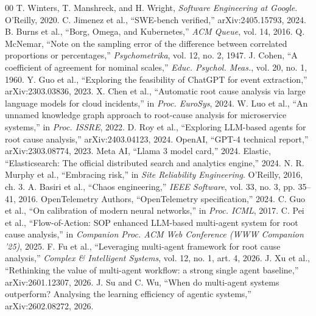 \documentclass[10pt,conference]{IEEEtran}
\begin{document}
\begin{thebibliography}{00}
 T. Winters, T. Manshreck, and H. Wright, \emph{Software Engineering at Google}. O'Reilly, 2020.
 C. Jimenez et al., ``SWE-bench verified,'' arXiv:2405.15793, 2024.
 B. Burns et al., ``Borg, Omega, and Kubernetes,'' \emph{ACM Queue}, vol. 14, 2016.
 Q. McNemar, ``Note on the sampling error of the difference between correlated proportions or percentages,'' \emph{Psychometrika}, vol. 12, no. 2, 1947.
 J. Cohen, ``A coefficient of agreement for nominal scales,'' \emph{Educ. Psychol. Meas.}, vol. 20, no. 1, 1960.
 Y. Guo et al., ``Exploring the feasibility of ChatGPT for event extraction,'' arXiv:2303.03836, 2023.
 X. Chen et al., ``Automatic root cause analysis via large language models for cloud incidents,'' in \emph{Proc. EuroSys}, 2024.
 W. Luo et al., ``An unnamed knowledge graph approach to root-cause analysis for microservice systems,'' in \emph{Proc. ISSRE}, 2022.
 D. Roy et al., ``Exploring LLM-based agents for root cause analysis,'' arXiv:2403.04123, 2024.
 OpenAI, ``GPT-4 technical report,'' arXiv:2303.08774, 2023.
 Meta AI, ``Llama 3 model card,'' 2024.
 Elastic, ``Elasticsearch: The official distributed search and analytics engine,'' 2024.
 N. R. Murphy et al., ``Embracing risk,'' in \emph{Site Reliability Engineering}. O'Reilly, 2016, ch. 3.
 A. Basiri et al., ``Chaos engineering,'' \emph{IEEE Software}, vol. 33, no. 3, pp. 35--41, 2016.
 OpenTelemetry Authors, ``OpenTelemetry specification,'' 2024.
 C. Guo et al., ``On calibration of modern neural networks,'' in \emph{Proc. ICML}, 2017.
 C. Pei et al., ``Flow-of-Action: SOP enhanced LLM-based multi-agent system for root cause analysis,'' in \emph{Companion Proc. ACM Web Conference (WWW Companion '25)}, 2025.
 F. Fu et al., ``Leveraging multi-agent framework for root cause analysis,'' \emph{Complex \& Intelligent Systems}, vol. 12, no. 1, art. 4, 2026.
 J. Xu et al., ``Rethinking the value of multi-agent workflow: a strong single agent baseline,'' arXiv:2601.12307, 2026.
 J. Su and C. Wu, ``When do multi-agent systems outperform? Analysing the learning efficiency of agentic systems,'' arXiv:2602.08272, 2026.

\end{thebibliography}
\end{document}
